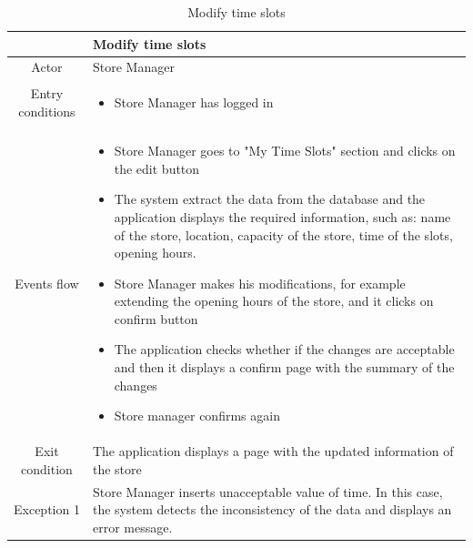 \documentclass[table, 12pt]{article}
\begin{document}
\begin{longtable}{|c| p{10cm}|}
    \caption{Modify time slots}                                                                                                                                        \\
    \hline
                     & Modify time slots                                                                                                                               \\
    \hline
    Actor            & Store Manager                                                                                                                                   \\
    \hline
    Entry conditions & \begin{itemize}
        \item Store Manager has logged in
    \end{itemize}                                                                                                                      \\
    \hline
    Events flow      & \begin{itemize}[nosep,after=\strut]
        \item Store Manager goes to "My Time Slots" section and clicks on the edit button
        \item The system extract the data from the database and the application displays the required information, such as: name of the store, location, capacity of the store, time of the slots, opening hours.
        \item Store Manager makes his modifications, for example extending the opening hours of the store, and it clicks on confirm button
        \item The application checks whether if the changes are acceptable and then it displays a confirm page with the summary of the changes
        \item Store manager confirms again
    \end{itemize}                                                                                                                      \\
    \hline
    Exit condition   & The application displays a page with the updated information of the store
    \\
    \hline
    \hline
    Exception 1      & Store Manager inserts unacceptable value of time. In this case, the system detects the inconsistency of the data and displays an error message. \\
    \hline
\end{longtable}
\end{document}
